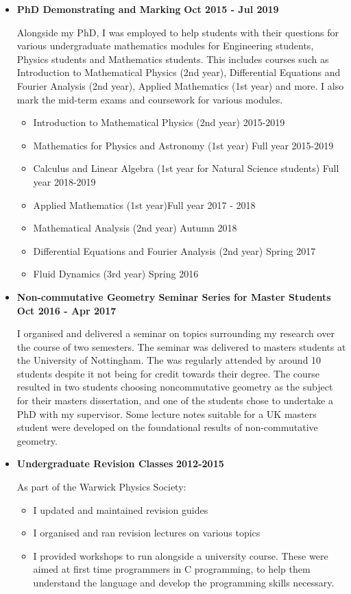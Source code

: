 \documentclass[a4paper,12pt]{article}
\begin{document}
\begin{itemize}
\item
  \textbf{ PhD Demonstrating and Marking} { \textbf{Oct 2015 - Jul
  2019}}

  Alongside my PhD, I was employed to help students with their questions
  for various undergraduate mathematics modules for Engineering
  students, Physics students and Mathematics students. This includes
  courses such as Introduction to Mathematical Physics (2nd year),
  Differential Equations and Fourier Analysis (2nd year), Applied
  Mathematics (1st year) and more. I also mark the mid-term exams and
  coursework for various modules.

  \begin{itemize}
  \tightlist
  \item
    Introduction to Mathematical Physics (2nd year) { 2015-2019}
  \item
    Mathematics for Physics and Astronomy (1st year) { Full year
    2015-2019}
  \item
    Calculus and Linear Algebra (1st year for Natural Science students)
    {Full year 2018-2019}
  \item
    Applied Mathematics (1st year){Full year 2017 - 2018}
  \item
    Mathematical Analysis (2nd year) { Autumn 2018}
  \item
    Differential Equations and Fourier Analysis (2nd year) {Spring 2017}
  \item
    Fluid Dynamics (3rd year) {Spring 2016 }
  \end{itemize}
\item
  \textbf{ Non-commutative Geometry Seminar Series for Master Students}
  { \textbf{Oct 2016 - Apr 2017}}

  I organised and delivered a seminar on topics surrounding my research
  over the course of two semesters. The seminar was delivered to masters
  students at the University of Nottingham. The was regularly attended
  by around 10 students despite it not being for credit towards their
  degree. The course resulted in two students choosing noncommutative
  geometry as the subject for their masters dissertation, and one of the
  students chose to undertake a PhD with my supervisor. Some lecture
  notes suitable for a UK masters student were developed on the
  foundational results of non-commutative geometry.
\item
  \textbf{Undergraduate Revision Classes} { \textbf{2012-2015}}

  As part of the Warwick Physics Society:

  \begin{itemize}
  \tightlist
  \item
    I updated and maintained revision guides
  \item
    I organised and ran revision lectures on various topics
  \item
    I provided workshops to run alongside a university course. These
    were aimed at first time programmers in C programming, to help them
    understand the language and develop the programming skills
    necessary.
  \end{itemize}
\end{itemize}
\end{document}
